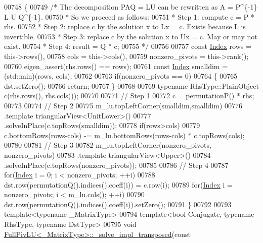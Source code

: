 \begin{DoxyCode}
00748 \textcolor{keyword}{}\{
00749   \textcolor{comment}{/* The decomposition PAQ = LU can be rewritten as A = P^\{-1\} L U Q^\{-1\}.}
00750 \textcolor{comment}{  * So we proceed as follows:}
00751 \textcolor{comment}{  * Step 1: compute c = P * rhs.}
00752 \textcolor{comment}{  * Step 2: replace c by the solution x to Lx = c. Exists because L is invertible.}
00753 \textcolor{comment}{  * Step 3: replace c by the solution x to Ux = c. May or may not exist.}
00754 \textcolor{comment}{  * Step 4: result = Q * c;}
00755 \textcolor{comment}{  */}
00756 
00757   \textcolor{keyword}{const} \hyperlink{group___core___module_a554f30542cc2316add4b1ea0a492ff02}{Index} rows = this->rows(),
00758               cols = this->cols(),
00759               nonzero\_pivots = this->rank();
00760   eigen\_assert(rhs.rows() == rows);
00761   \textcolor{keyword}{const} \hyperlink{group___core___module_a554f30542cc2316add4b1ea0a492ff02}{Index} smalldim = (std::min)(rows, cols);
00762 
00763   \textcolor{keywordflow}{if}(nonzero\_pivots == 0)
00764   \{
00765     dst.setZero();
00766     \textcolor{keywordflow}{return};
00767   \}
00768 
00769   \textcolor{keyword}{typename} RhsType::PlainObject c(rhs.rows(), rhs.cols());
00770 
00771   \textcolor{comment}{// Step 1}
00772   c = permutationP() * rhs;
00773 
00774   \textcolor{comment}{// Step 2}
00775   m\_lu.topLeftCorner(smalldim,smalldim)
00776       .template triangularView<UnitLower>()
00777       .solveInPlace(c.topRows(smalldim));
00778   \textcolor{keywordflow}{if}(rows>cols)
00779     c.bottomRows(rows-cols) -= m\_lu.bottomRows(rows-cols) * c.topRows(cols);
00780 
00781   \textcolor{comment}{// Step 3}
00782   m\_lu.topLeftCorner(nonzero\_pivots, nonzero\_pivots)
00783       .template triangularView<Upper>()
00784       .solveInPlace(c.topRows(nonzero\_pivots));
00785 
00786   \textcolor{comment}{// Step 4}
00787   \textcolor{keywordflow}{for}(\hyperlink{group___core___module_a554f30542cc2316add4b1ea0a492ff02}{Index} i = 0; i < nonzero\_pivots; ++i)
00788     dst.row(permutationQ().indices().coeff(i)) = c.row(i);
00789   \textcolor{keywordflow}{for}(\hyperlink{group___core___module_a554f30542cc2316add4b1ea0a492ff02}{Index} i = nonzero\_pivots; i < m\_lu.cols(); ++i)
00790     dst.row(permutationQ().indices().coeff(i)).setZero();
00791 \}
00792 
00793 \textcolor{keyword}{template}<\textcolor{keyword}{typename} \_MatrixType>
00794 \textcolor{keyword}{template}<\textcolor{keywordtype}{bool} Conjugate, \textcolor{keyword}{typename} RhsType, \textcolor{keyword}{typename} DstType>
00795 \textcolor{keywordtype}{void} \hyperlink{group___l_u___module_class_eigen_1_1_full_piv_l_u}{FullPivLU<\_MatrixType>::\_solve\_impl\_transposed}(\textcolor{keyword}{const} 

\end{DoxyCode}
